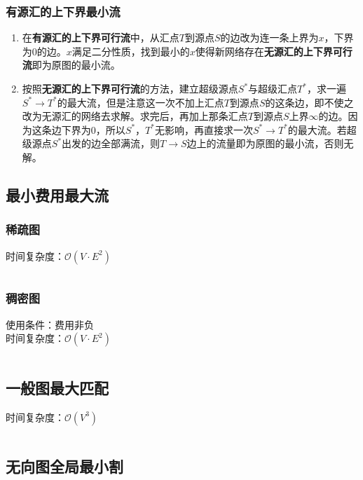 \documentclass[a4paper]{article}
\newcommand{\cppcode}[1]{
    \inputminted[mathescape,
    frame=lines,linenos]{cpp}{source/#1}
}
\begin{document}
\subsubsection{有源汇的上下界最小流}

\begin{enumerate}
	\item 在\textbf{有源汇的上下界可行流}中，从汇点$T$到源点$S$的边改为连一条上界为$x$，下界为$0$的边。$x$满足二分性质，找到最小的$x$使得新网络存在\textbf{无源汇的上下界可行流}即为原图的最小流。
	\item 按照\textbf{无源汇的上下界可行流}的方法，建立超级源点$S^*$与超级汇点$T^*$，求一遍$S^* \rightarrow T^*$的最大流，但是注意这一次不加上汇点$T$到源点$S$的这条边，即不使之改为无源汇的网络去求解。求完后，再加上那条汇点$T$到源点$S$上界$\infty$的边。因为这条边下界为$0$，所以$S^*$，$T^*$无影响，再直接求一次$S^* \rightarrow T^*$的最大流。若超级源点$S^*$出发的边全部满流，则$T \rightarrow S$边上的流量即为原图的最小流，否则无解。
\end{enumerate}

\subsection{最小费用最大流}

\subsubsection{稀疏图}

时间复杂度：$\mathcal{O}(V \cdot E^2)$

\cppcode{graph-theory/minimum-cost-flow-spfa.cpp}

\subsubsection{稠密图}

使用条件：费用非负\\
\indent 时间复杂度：$\mathcal{O}(V \cdot E^2)$

\cppcode{graph-theory/minimum-cost-flow-zkw.cpp}

\subsection{一般图最大匹配}

时间复杂度：$\mathcal{O}(V^3)$

\cppcode{graph-theory/maximum-matching-blossom.cpp}

\subsection{无向图全局最小割}
\end{document}

